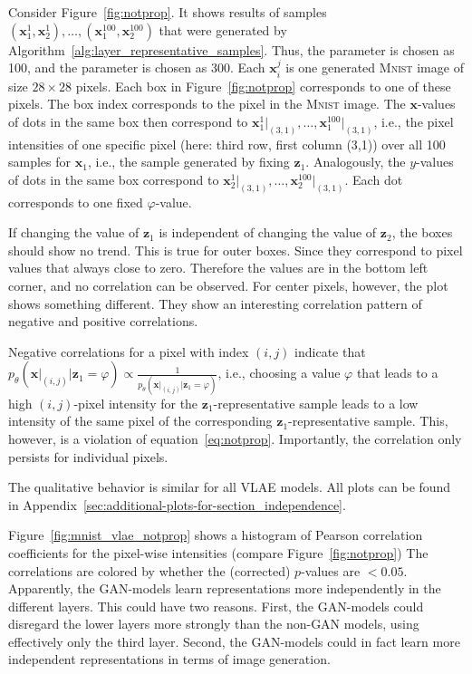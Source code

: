 Consider Figure~\ref{fig:notprop}.
It shows results of samples $(\bm{x}_1^1,\bm{x}_2^1),\dots,(\bm{x}_1^{100},\bm{x}_2^{100})$ that were generated by Algorithm~\ref{alg:layer_representative_samples}.
Thus, the parameter  is chosen as 100, and the parameter  is chosen as 300.
Each $\bm{x}_i^j$ is one generated \textsc{Mnist} image of size $28\times 28$ pixels.
Each box in Figure~\ref{fig:notprop} corresponds to one of these pixels.
The box index corresponds to the pixel in the \textsc{Mnist} image.
The $\bm{x}$-values of dots in the same box then correspond to $\bm{x}_1^1\big|_{(3,1)}, \dots, \bm{x}_1^{100}\big|_{(3,1)}$, i.e., the pixel intensities of one specific pixel (here: third row, first column (3,1)) over all 100 samples for $\bm{x}_1$, i.e., the sample generated by fixing $\bm{z}_1$.
Analogously, the $y$-values of dots in the same box correspond to $\bm{x}_2^1\big|_{(3,1)}, \dots, \bm{x}_2^{100}\big|_{(3,1)}$.
Each dot corresponds to one fixed $\varphi$-value.

If changing the value of $\bm{z}_1$ is independent of changing the value of $\bm{z}_2$, the boxes should show no trend.
This is true for outer boxes.
Since they correspond to pixel values that always close to zero.
Therefore the values are in the bottom left corner, and no correlation can be observed.
For center pixels, however, the plot shows something different.
They show an interesting correlation pattern of negative and positive correlations.

Negative correlations for a pixel with index $(i,j)$ indicate that $p_\theta(\bm{x}\big|_{(i,j)} | \bm{z}_1 = \varphi) \propto \frac{1}{p_\theta(\bm{x}\big|_{(i,j)} | \bm{z}_1 = \varphi)}$, i.e., choosing a value $\varphi$ that leads to a high $(i,j)$-pixel intensity for the $\bm{z}_1$-representative sample leads to a low intensity of the same pixel of the corresponding $\bm{z}_1$-representative sample.
This, however, is a violation of equation~\ref{eq:notprop}.
Importantly, the correlation only persists for individual pixels.

The qualitative behavior is similar for all \ac{VLAE} models.
All plots can be found in Appendix~\ref{sec:additional-plots-for-section_independence}.

Figure~\ref{fig:mnist_vlae_notprop} shows a histogram of Pearson correlation coefficients for the pixel-wise intensities (compare Figure~\ref{fig:notprop})
The correlations are colored by whether the (corrected) $p$-values are $< 0.05$.
Apparently, the \ac{GAN}-models learn representations more independently in the different layers.
This could have two reasons.
First, the \ac{GAN}-models could disregard the lower layers more strongly than the non-\ac{GAN} models, using effectively only the third layer.
Second, the \ac{GAN}-models could in fact learn more independent representations in terms of image generation.


